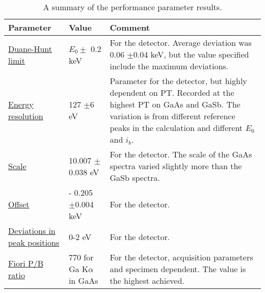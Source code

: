 \begin{table}[hbpt]
    \begin{center}
        \caption{
            A summary of the performance parameter results.
        }
        \renewcommand*{\arraystretch}{1.2}
        \label{tab:results:performance_summary}
        \begin{tabular}{p{2.5cm}p{4cm}p{7cm}}
            \hline
            \textbf{Parameter}                                            & \textbf{Value}                & \textbf{Comment}                                                                                                                                                                                       \\
            \hline%
            \hyperref[results:duane_hunt]{Duane-Hunt limit}               & $E_0 \pm$ 0.2 keV             & For the detector. Average deviation was 0.06 $\pm$0.04 keV, but the value specified include the maximum deviations.                                                                                    \\
            \hyperref[results:energy_resolution]{Energy resolution}       & 127 $\pm$6 eV                 & Parameter for the detector, but highly dependent on PT. Recorded at the highest PT on GaAs and GaSb. The variation is from different reference peaks in the calculation and different $E_0$ and $i_b$. \\
            \hyperref[results:scaleoffset]{Scale}                         & 10.007 $\pm$0.038 eV          & For the detector. The scale of the GaAs spectra varied slightly more than the GaSb spectra.                                                                                                            \\
            \hyperref[results:scaleoffset]{Offset}                        & - 0.205 $\pm$0.004 keV        & For the detector.                                                                                                                                                                                      \\
            \hyperref[results:scaleoffset]{Deviations in peak positions}  & 0-2 eV                        & For the detector.                                                                                                                                                                                      \\
            \hyperref[results:fiori]{Fiori P/B ratio}                     & 770 for Ga K$\alpha$ in GaAs  & For the detector, acquisition parameters and specimen dependent. The value is the highest achieved.                                                                                                    \\

\end{tabular}
\end{center}
\end{table}
